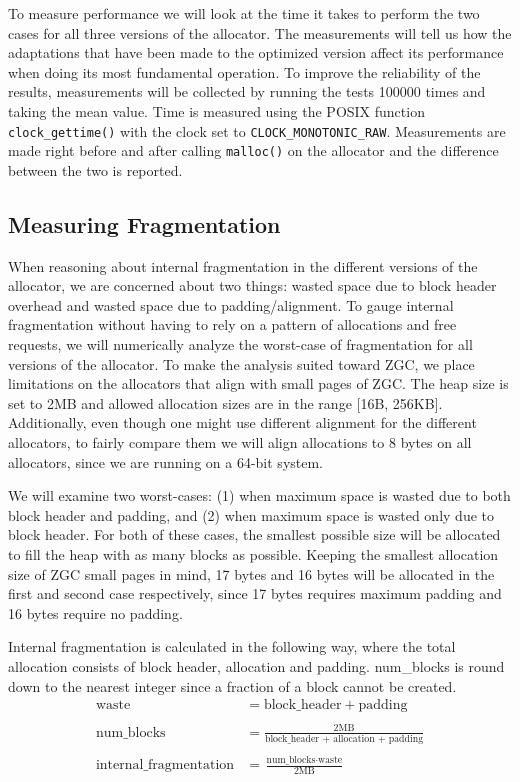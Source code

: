To measure performance we will look at the time it takes to perform the two cases for all three versions of the allocator. The measurements will tell us how the adaptations that have been made to the optimized version affect its performance when doing its most fundamental operation. To improve the reliability of the results, measurements will be collected by running the tests 100000 times and taking the mean value. Time is measured using the POSIX function \texttt{clock\_gettime()} with the clock set to \texttt{CLOCK\_MONOTONIC\_RAW}. Measurements are made right before and after calling \texttt{malloc()} on the allocator and the difference between the two is reported.

\subsection{Measuring Fragmentation}

When reasoning about internal fragmentation in the different versions of the allocator, we are concerned about two things: wasted space due to block header overhead and wasted space due to padding/alignment. To gauge internal fragmentation without having to rely on a pattern of allocations and free requests, we will numerically analyze the worst-case of fragmentation for all versions of the allocator. To make the analysis suited toward ZGC, we place limitations on the allocators that align with small pages of ZGC. The heap size is set to 2MB and allowed allocation sizes are in the range [16B, 256KB]. Additionally, even though one might use different alignment for the different allocators, to fairly compare them we will align allocations to 8 bytes on all allocators, since we are running on a 64-bit system.

We will examine two worst-cases: (1) when maximum space is wasted due to both block header and padding, and (2) when maximum space is wasted only due to block header. For both of these cases, the smallest possible size will be allocated to fill the heap with as many blocks as possible. Keeping the smallest allocation size of ZGC small pages in mind, 17 bytes and 16 bytes will be allocated in the first and second case respectively, since 17 bytes requires maximum padding and 16 bytes require no padding.

Internal fragmentation is calculated in the following way, where the total allocation consists of block header, allocation and padding. num\_blocks is round down to the nearest integer since a fraction of a block cannot be created.
\begin{align*}
    \text{waste} &= \text{block\_header} + \text{padding} \\\\
    \text{num\_blocks} &= \frac{2\text{MB}}{\text{block\_header + allocation + padding}} \\\\
    \text{internal\_fragmentation} &= \frac{\text{num\_blocks} \cdot \text{waste}}{2\text{MB}}
\end{align*}

